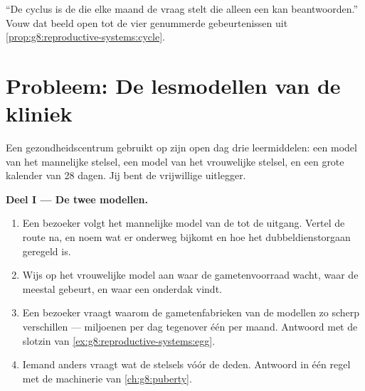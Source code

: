 \begin{exercise}[$\star\star\star$]\label{exo:g8:reproductive-systems:12}
``De cyclus is de  die elke maand de vraag stelt die alleen een
 kan beantwoorden.'' Vouw dat beeld open tot de vier genummerde
gebeurtenissen uit
\cref{prop:g8:reproductive-systems:cycle}.
\end{exercise}

\section{Probleem: De lesmodellen van de kliniek}

\begin{problem}\label{pb:g8:reproductive-systems:1}
Een gezondheidscentrum gebruikt op zijn open dag drie leermiddelen: een
model van het mannelijke stelsel, een model van het vrouwelijke stelsel,
en een grote kalender van 28 dagen. Jij bent de vrijwillige uitlegger.

\medskip\noindent\textbf{Deel I --- De twee modellen.}
\begin{enumerate}
  \item Een bezoeker volgt het mannelijke model van de  tot de
        uitgang. Vertel de route na, en noem wat er onderweg bijkomt en
        hoe het dubbeldienstorgaan geregeld is.
  \item Wijs op het vrouwelijke model aan waar de gametenvoorraad wacht,
        waar de  meestal gebeurt, en waar een 
        onderdak vindt.
  \item Een bezoeker vraagt waarom de gametenfabrieken van de modellen zo
        scherp verschillen --- miljoenen per dag tegenover één per maand.
        Antwoord met de slotzin van
        \cref{ex:g8:reproductive-systems:egg}.
  \item Iemand anders vraagt wat de stelsels vóór de  deden.
        Antwoord in één regel met de machinerie van \cref{ch:g8:puberty}.
\end{enumerate}


\end{problem}
